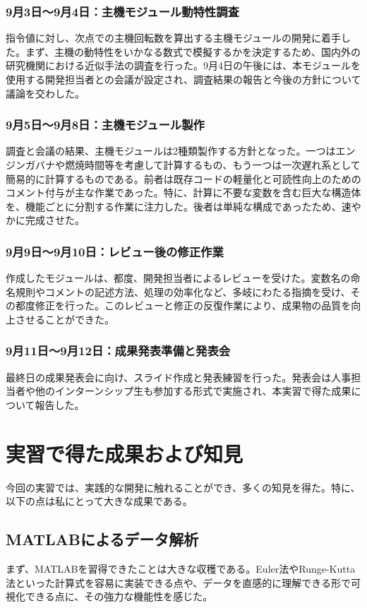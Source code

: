 \documentclass[a4j,11pt]{jsarticle}
\begin{document}
\subsubsection{9月3日〜9月4日：主機モジュール動特性調査}
指令値に対し、次点での主機回転数を算出する主機モジュールの開発に着手した。まず、主機の動特性をいかなる数式で模擬するかを決定するため、国内外の研究機関における近似手法の調査を行った。9月4日の午後には、本モジュールを使用する開発担当者との会議が設定され、調査結果の報告と今後の方針について議論を交わした。

\subsubsection{9月5日〜9月8日：主機モジュール製作}
調査と会議の結果、主機モジュールは2種類製作する方針となった。一つはエンジンガバナや燃焼時間等を考慮して計算するもの、もう一つは一次遅れ系として簡易的に計算するものである。前者は既存コードの軽量化と可読性向上のためのコメント付与が主な作業であった。特に、計算に不要な変数を含む巨大な構造体を、機能ごとに分割する作業に注力した。後者は単純な構成であったため、速やかに完成させた。

\subsubsection{9月9日〜9月10日：レビュー後の修正作業}
作成したモジュールは、都度、開発担当者によるレビューを受けた。変数名の命名規則やコメントの記述方法、処理の効率化など、多岐にわたる指摘を受け、その都度修正を行った。このレビューと修正の反復作業により、成果物の品質を向上させることができた。

\subsubsection{9月11日〜9月12日：成果発表準備と発表会}
最終日の成果発表会に向け、スライド作成と発表練習を行った。発表会は人事担当者や他のインターンシップ生も参加する形式で実施され、本実習で得た成果について報告した。

\section{実習で得た成果および知見}
\label{sec:results}
今回の実習では、実践的な開発に触れることができ、多くの知見を得た。特に、以下の点は私にとって大きな成果である。

\subsection{MATLABによるデータ解析}
まず、MATLABを習得できたことは大きな収穫である。Euler法やRunge-Kutta法といった計算式を容易に実装できる点や、データを直感的に理解できる形で可視化できる点に、その強力な機能性を感じた。
\end{document}
